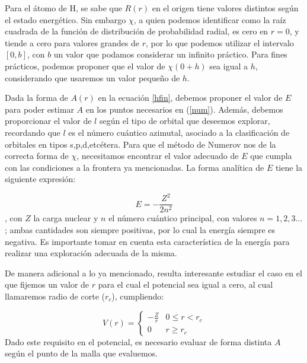 \documentclass[12pt,a4paper]{report}
\begin{document}
Para el átomo de H, se sabe que $R(r)$ en el origen tiene valores distintos según el estado energético. Sin embargo $\chi$, a quien podemos identificar como la raíz cuadrada de la función de distribución de probabilidad radial, es cero en $r=0$, y tiende a cero para valores grandes de $r$, por lo que podemos utilizar el intervalo $\left[0,b \right]$, con $b$ un valor que podamos considerar un infinito práctico. Para fines prácticos, podemos proponer que el valor de $\chi(0+h)$ sea igual a $h$, considerando que usaremos un valor pequeño de $h$.

Dada la forma de $A(r)$ en la ecuación \ref{hfin}, debemos proponer el valor de $E$ para poder estimar $A$ en los puntos necesarios en (\ref{num}). Además, debemos proporcionar el valor de $l$ según el tipo de orbital que deseemos explorar, recordando que $l$ es el número cuántico azimutal, asociado a la clasificación de orbitales en tipos s,p,d,etcétera. Para que el método de Numerov nos de la correcta forma de $\chi$, necesitamos encontrar el valor adecuado de $E$ que cumpla con las condiciones a la frontera ya mencionadas. La forma analítica de $E$ tiene la siguiente expresión:

\begin{equation}\label{hene}
E=-\frac{Z^2}{2n^2}
\end{equation}
, con $Z$ la carga nuclear y $n$ el número cuántico principal, con valores $n=1,2,3\ldots$; ambas cantidades son siempre positivas, por lo cual la energía siempre es negativa. Es importante tomar en cuenta esta característica de la energía para realizar una exploración adecuada de la misma.

De manera adicional a lo ya mencionado, resulta interesante estudiar el caso en el que fijemos un valor de $r$ para el cual el potencial sea igual a cero, al cual llamaremos radio de corte ($r_c$), cumpliendo:

\begin{equation}
V(r)=\begin{cases}
-\frac{Z}{r}&0\leq r < r_c\\
0&r\geq r_c
\end{cases}
\end{equation}
Dado este requisito en el potencial, es necesario evaluar de forma distinta $A$ según el punto de la malla que evaluemos.
\end{document}
